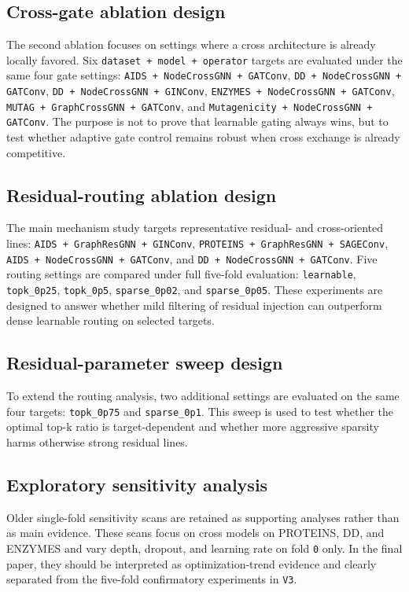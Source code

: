 \subsection*{Cross-gate ablation design}

The second ablation focuses on settings where a cross architecture is already locally favored. Six \texttt{dataset + model + operator} targets are evaluated under the same four gate settings: \texttt{AIDS + NodeCrossGNN + GATConv}, \texttt{DD + NodeCrossGNN + GATConv}, \texttt{DD + NodeCrossGNN + GINConv}, \texttt{ENZYMES + NodeCrossGNN + GATConv}, \texttt{MUTAG + GraphCrossGNN + GATConv}, and \texttt{Mutagenicity + NodeCrossGNN + GATConv}. The purpose is not to prove that learnable gating always wins, but to test whether adaptive gate control remains robust when cross exchange is already competitive.

\subsection*{Residual-routing ablation design}

The main mechanism study targets representative residual- and cross-oriented lines: \texttt{AIDS + GraphResGNN + GINConv}, \texttt{PROTEINS + GraphResGNN + SAGEConv}, \texttt{AIDS + NodeCrossGNN + GATConv}, and \texttt{DD + NodeCrossGNN + GATConv}. Five routing settings are compared under full five-fold evaluation: \texttt{learnable}, \texttt{topk\_0p25}, \texttt{topk\_0p5}, \texttt{sparse\_0p02}, and \texttt{sparse\_0p05}. These experiments are designed to answer whether mild filtering of residual injection can outperform dense learnable routing on selected targets.

\subsection*{Residual-parameter sweep design}

To extend the routing analysis, two additional settings are evaluated on the same four targets: \texttt{topk\_0p75} and \texttt{sparse\_0p1}. This sweep is used to test whether the optimal top-k ratio is target-dependent and whether more aggressive sparsity harms otherwise strong residual lines.

\subsection*{Exploratory sensitivity analysis}

Older single-fold sensitivity scans are retained as supporting analyses rather than as main evidence. These scans focus on cross models on PROTEINS, DD, and ENZYMES and vary depth, dropout, and learning rate on fold \texttt{0} only. In the final paper, they should be interpreted as optimization-trend evidence and clearly separated from the five-fold confirmatory experiments in \texttt{V3}.
